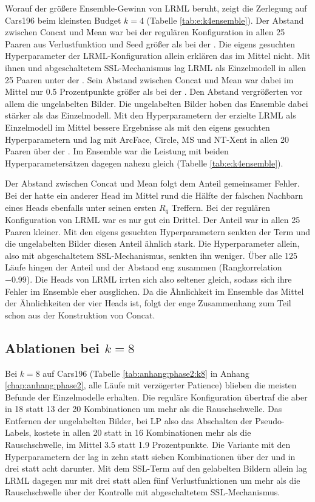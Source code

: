 Worauf der größere Ensemble-Gewinn von \ac{LRML} beruht, zeigt die Zerlegung auf Cars196 beim kleinsten Budget $k=4$ (Tabelle \ref{tab:e:k4ensemble}). Der Abstand zwischen Concat und Mean war bei der regulären Konfiguration in allen 25 Paaren aus Verlustfunktion und Seed größer als bei der \UEBL. Die eigens gesuchten Hyperparameter der \ac{LRML}-Konfiguration allein erklären das im Mittel nicht. Mit ihnen und abgeschaltetem \ac{SSL}-Mechanismus lag \ac{LRML} als Einzelmodell in allen 25 Paaren unter der \UEBL. Sein Abstand zwischen Concat und Mean war dabei im Mittel nur \num{0.5} Prozentpunkte größer als bei der \UEBL. Den Abstand vergrößerten vor allem die ungelabelten Bilder. Die ungelabelten Bilder hoben das Ensemble dabei stärker als das Einzelmodell. Mit den Hyperparametern der \UEBL erzielte \ac{LRML} als Einzelmodell im Mittel bessere Ergebnisse als mit den eigens gesuchten Hyperparametern und lag mit ArcFace, Circle, \ac{MS} und \ac{NT-Xent} in allen 20 Paaren über der \UEBL. Im Ensemble war die Leistung mit beiden Hyperparametersätzen dagegen nahezu gleich (Tabelle \ref{tab:e:k4ensemble}). 



Der Abstand zwischen Concat und Mean folgt dem Anteil gemeinsamer Fehler. Bei der \UEBL hatte ein anderer Head im Mittel rund die Hälfte der falschen Nachbarn eines Heads ebenfalls unter seinen ersten $R_q$ Treffern. Bei der regulären Konfiguration von \ac{LRML} war es nur gut ein Drittel. Der Anteil war in allen 25 Paaren kleiner. Mit den eigens gesuchten Hyperparametern senkten der Term und die ungelabelten Bilder diesen Anteil ähnlich stark. Die Hyperparameter allein, also mit abgeschaltetem \ac{SSL}-Mechanismus, senkten ihn weniger. Über alle 125 Läufe hingen der Anteil und der Abstand eng zusammen (Rangkorrelation \num{-0.99}). Die Heads von \ac{LRML} irrten sich also seltener gleich, sodass sich ihre Fehler im Ensemble eher ausglichen. Da die Ähnlichkeit im Ensemble das Mittel der Ähnlichkeiten der vier Heads ist, folgt der enge Zusammenhang zum Teil schon aus der Konstruktion von Concat.

\subsection{Ablationen bei \texorpdfstring{$k=8$}{k=8}}
\label{sec:e:phase2:k8}

Bei $k=8$ auf Cars196 (Tabelle \ref{tab:anhang:phase2:k8} in Anhang \ref{chap:anhang:phase2}, alle Läufe mit verzögerter Patience) blieben die meisten Befunde der Einzelmodelle erhalten. Die reguläre Konfiguration übertraf die \UEBL aber in 18 statt 13 der 20 Kombinationen um mehr als die Rauschschwelle. Das Entfernen der ungelabelten Bilder, bei \ac{LP} also das Abschalten der Pseudo-Labels, kostete in allen 20 statt in 16 Kombinationen mehr als die Rauschschwelle, im Mittel \num{3.5} statt \num{1.9} Prozentpunkte. Die Variante mit den Hyperparametern der \UEBL lag in zehn statt sieben Kombinationen über der \UEBL und in drei statt acht darunter. Mit dem \ac{SSL}-Term auf den gelabelten Bildern allein lag \ac{LRML} dagegen nur mit drei statt allen fünf Verlustfunktionen um mehr als die Rauschschwelle über der Kontrolle mit abgeschaltetem \ac{SSL}-Mechanismus.

